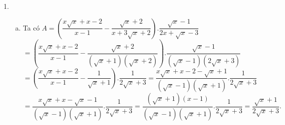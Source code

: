     {
\begin{enumerate}[1)]
\item 
\begin{enumerate}[a)]
\item Ta có $A=\left(\dfrac{x\sqrt{x} + x - 2}{x - 1} - \dfrac{\sqrt{x} + 2}{x + 3\sqrt{x} + 2}\right). \dfrac{\sqrt{x} - 1}{2x + \sqrt{x} - 3}$\\
$=\left(\dfrac{x\sqrt{x} + x - 2}{x - 1} - \dfrac{\sqrt{x} + 2}{\left(\sqrt{x} + 1\right)\left(\sqrt{x} + 2\right)}\right). \dfrac{\sqrt{x} - 1}{\left(\sqrt{x} - 1\right)\left(2\sqrt{x} + 3\right)}$ \\
$=\left(\dfrac{x\sqrt{x} + x - 2}{x - 1} - \dfrac{1}{\sqrt{x} + 1}\right). \dfrac{1}{2\sqrt{x} + 3}=\dfrac{x\sqrt{x} + x - 2 - \sqrt{x} + 1}{\left(\sqrt{x} - 1\right)\left(\sqrt{x} + 1\right)}. \dfrac{1}{2\sqrt{x} + 3}$ \\
$=\dfrac{x\sqrt{x} + x - \sqrt{x} - 1}{\left(\sqrt{x} - 1\right)\left(\sqrt{x} + 1\right)}. \dfrac{1}{2\sqrt{x} + 3}=\dfrac{\left(\sqrt{x} + 1\right)(x - 1)}{\left(\sqrt{x} - 1\right)\left(\sqrt{x} + 1\right)}. \dfrac{1}{2\sqrt{x} + 3}=\dfrac{\sqrt{x} + 1}{2\sqrt{x} + 3}.$
		

\end{enumerate}
\end{enumerate}}
